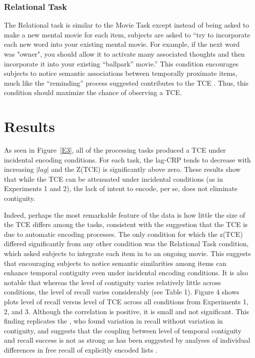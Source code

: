 \documentclass[jou,natbib,floatsintext]{apa6} %
\begin{document}
\subsubsection{Relational Task} The Relational task is similar to the Movie Task except instead of being asked to make a new mental movie for each item, subjects are asked to ``try to incorporate each new word into your existing mental movie. For example, if the next word was "owner", you should allow it to activate many associated thoughts and then incorporate it into your existing ``ballpark'' movie.'' This condition encourages subjects to notice semantic associations between temporally proximate items, much like the ``reminding'' process \cite{Hint16} suggested contributes to the TCE \citep{Hint16}. Thus, this condition should maximize the chance of observing a TCE. 

\section{Results}

As seen in Figure~\ref{E3}, all of the processing tasks produced a TCE under incidental encoding conditions. For each task, the lag-CRP tends to decrease with increasing $|lag|$ and the Z(TCE) is significantly above zero. These results show that while the TCE can be attenuated under incidental conditions (as in Experiments 1 and 2), the lack of intent to encode, per se, does not eliminate contiguity. 

Indeed, perhaps the most remarkable feature of the data is how little the size of the TCE differs among the tasks, consistent with the suggestion that the TCE is due to automatic encoding processes. The only condition for which the z(TCE) differed significantly from any other condition was the Relational Task condition, which asked subjects to integrate each item in to an ongoing movie. This suggests that encouraging subjects to notice semantic similarities among items can enhance temporal contiguity even under incidental encoding conditions. %
It is also notable that whereas the level of contiguity varies relatively little across conditions, the level of recall varies considerably (see Table 1). Figure 4 shows plots level of recall versus level of TCE across all conditions from Experiments 1, 2, and 3. Although the correlation is positive, it is small and not significant. This finding replicates the \citep{NairEtal17}, who found variation in recall without variation in contiguity, and suggests that the coupling between level of temporal contiguity and recall success is not as strong as has been suggested by analyses of individual differences in free recall of explicitly encoded lists \citep{SedeEtal10,Healetal14}. 
\end{document}
